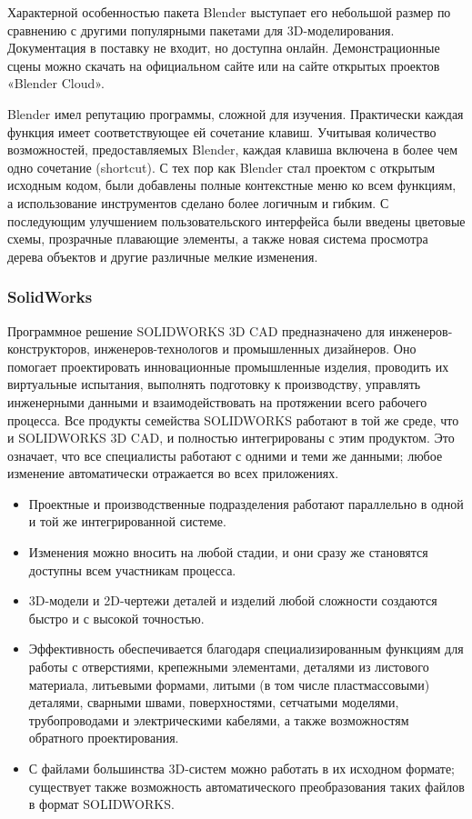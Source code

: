 Характерной особенностью пакета Blender выступает его небольшой размер по сравнению с другими популярными пакетами для 3D-моделирования. Документация в поставку не входит, но доступна онлайн. Демонстрационные сцены можно скачать на официальном сайте или на сайте открытых проектов «Blender Cloud». 


Blender имел репутацию программы, сложной для изучения. Практически каждая функция имеет соответствующее ей сочетание клавиш. Учитывая количество возможностей, предоставляемых Blender, каждая клавиша включена в более чем одно сочетание (shortcut). С тех пор как Blender стал проектом с открытым исходным кодом, были добавлены полные контекстные меню ко всем функциям, а использование инструментов сделано более логичным и гибким. С последующим улучшением пользовательского интерфейса были введены цветовые схемы, прозрачные плавающие элементы, а также новая система просмотра дерева объектов и другие различные мелкие изменения.

\subsubsection{SolidWorks}

Программное решение SOLIDWORKS 3D CAD предназначено для инженеров-конструкторов, инженеров-технологов и промышленных дизайнеров. Оно помогает проектировать инновационные промышленные изделия, проводить их виртуальные испытания, выполнять подготовку к производству, управлять инженерными данными и взаимодействовать на протяжении всего рабочего процесса. Все продукты семейства SOLIDWORKS работают в той же среде, что и SOLIDWORKS 3D CAD, и полностью интегрированы с этим продуктом. Это означает, что все специалисты работают с одними и теми же данными; любое изменение автоматически отражается во всех приложениях.

\begin{itemize}
    \item Проектные и производственные подразделения работают параллельно в одной и той же интегрированной системе.
    \item Изменения можно вносить на любой стадии, и они сразу же становятся доступны всем участникам процесса.
    \item 3D-модели и 2D-чертежи деталей и изделий любой сложности создаются быстро и с высокой точностью.
    \item Эффективность обеспечивается благодаря специализированным функциям для работы с отверстиями, крепежными элементами, деталями из листового материала, литьевыми формами, литыми (в том числе пластмассовыми) деталями, сварными швами, поверхностями, сетчатыми моделями, трубопроводами
    и электрическими кабелями, а также возможностям обратного проектирования.
    \item С файлами большинства 3D-систем можно работать в их исходном формате; существует также возможность автоматического преобразования таких файлов в формат SOLIDWORKS.
\end{itemize}

